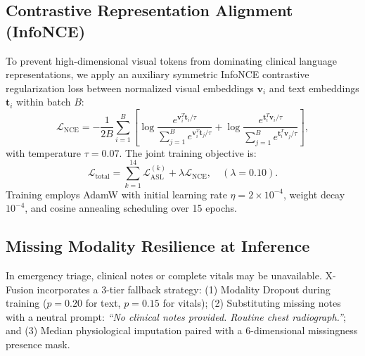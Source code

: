 \documentclass[conference]{IEEEtran}
\begin{document}
\subsection{Contrastive Representation Alignment (InfoNCE)}
To prevent high-dimensional visual tokens from dominating clinical language representations, we apply an auxiliary symmetric InfoNCE contrastive regularization loss between normalized visual embeddings $\mathbf{v}_i$ and text embeddings $\mathbf{t}_i$ within batch $B$:
\begin{equation}
\mathcal{L}_{\mathrm{NCE}} = -\frac{1}{2B} \sum_{i=1}^B \left[ \log \frac{e^{\mathbf{v}_i^T \mathbf{t}_i / \tau}}{\sum_{j=1}^B e^{\mathbf{v}_i^T \mathbf{t}_j / \tau}} + \log \frac{e^{\mathbf{t}_i^T \mathbf{v}_i / \tau}}{\sum_{j=1}^B e^{\mathbf{t}_i^T \mathbf{v}_j / \tau}} \right],
\end{equation}
with temperature $\tau = 0.07$. The joint training objective is:
\begin{equation}
\mathcal{L}_{\mathrm{total}} = \sum_{k=1}^{14} \mathcal{L}_{\mathrm{ASL}}^{(k)} + \lambda \mathcal{L}_{\mathrm{NCE}}, \quad (\lambda = 0.10).
\end{equation}
Training employs AdamW with initial learning rate $\eta = 2 \times 10^{-4}$, weight decay $10^{-4}$, and cosine annealing scheduling over 15 epochs.

\subsection{Missing Modality Resilience at Inference}
In emergency triage, clinical notes or complete vitals may be unavailable. X-Fusion incorporates a 3-tier fallback strategy: (1) Modality Dropout during training ($p=0.20$ for text, $p=0.15$ for vitals); (2) Substituting missing notes with a neutral prompt: \textit{``No clinical notes provided. Routine chest radiograph.''}; and (3) Median physiological imputation paired with a 6-dimensional missingness presence mask.
\end{document}
